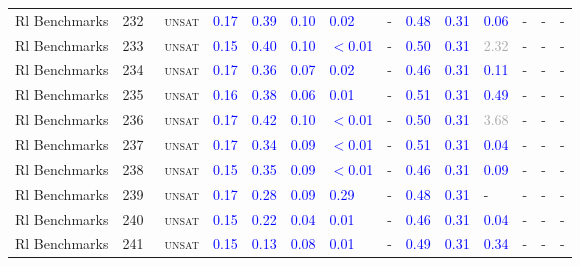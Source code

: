 \begin{center}
{\begin{longtable}{@{}llllllllllllll@{}}
Rl Benchmarks & 232 & ~\textsc{unsat} & \textcolor{blue}{0.17} & \textcolor{blue}{0.39} & \textcolor{blue}{0.10} & \textcolor{blue}{0.02} & - & \textcolor{blue}{0.48} & \textcolor{blue}{0.31} & \textcolor{blue}{0.06} & - & - & - \\
Rl Benchmarks & 233 & ~\textsc{unsat} & \textcolor{blue}{0.15} & \textcolor{blue}{0.40} & \textcolor{blue}{0.10} & \textcolor{blue}{$<$0.01} & - & \textcolor{blue}{0.50} & \textcolor{blue}{0.31} & \textcolor{darkgray}{2.32} & - & - & - \\
Rl Benchmarks & 234 & ~\textsc{unsat} & \textcolor{blue}{0.17} & \textcolor{blue}{0.36} & \textcolor{blue}{0.07} & \textcolor{blue}{0.02} & - & \textcolor{blue}{0.46} & \textcolor{blue}{0.31} & \textcolor{blue}{0.11} & - & - & - \\
Rl Benchmarks & 235 & ~\textsc{unsat} & \textcolor{blue}{0.16} & \textcolor{blue}{0.38} & \textcolor{blue}{0.06} & \textcolor{blue}{0.01} & - & \textcolor{blue}{0.51} & \textcolor{blue}{0.31} & \textcolor{blue}{0.49} & - & - & - \\
Rl Benchmarks & 236 & ~\textsc{unsat} & \textcolor{blue}{0.17} & \textcolor{blue}{0.42} & \textcolor{blue}{0.10} & \textcolor{blue}{$<$0.01} & - & \textcolor{blue}{0.50} & \textcolor{blue}{0.31} & \textcolor{darkgray}{3.68} & - & - & - \\
Rl Benchmarks & 237 & ~\textsc{unsat} & \textcolor{blue}{0.17} & \textcolor{blue}{0.34} & \textcolor{blue}{0.09} & \textcolor{blue}{$<$0.01} & - & \textcolor{blue}{0.51} & \textcolor{blue}{0.31} & \textcolor{blue}{0.04} & - & - & - \\
Rl Benchmarks & 238 & ~\textsc{unsat} & \textcolor{blue}{0.15} & \textcolor{blue}{0.35} & \textcolor{blue}{0.09} & \textcolor{blue}{$<$0.01} & - & \textcolor{blue}{0.46} & \textcolor{blue}{0.31} & \textcolor{blue}{0.09} & - & - & - \\
Rl Benchmarks & 239 & ~\textsc{unsat} & \textcolor{blue}{0.17} & \textcolor{blue}{0.28} & \textcolor{blue}{0.09} & \textcolor{blue}{0.29} & - & \textcolor{blue}{0.48} & \textcolor{blue}{0.31} & - & - & - & - \\
Rl Benchmarks & 240 & ~\textsc{unsat} & \textcolor{blue}{0.15} & \textcolor{blue}{0.22} & \textcolor{blue}{0.04} & \textcolor{blue}{0.01} & - & \textcolor{blue}{0.46} & \textcolor{blue}{0.31} & \textcolor{blue}{0.04} & - & - & - \\
Rl Benchmarks & 241 & ~\textsc{unsat} & \textcolor{blue}{0.15} & \textcolor{blue}{0.13} & \textcolor{blue}{0.08} & \textcolor{blue}{0.01} & - & \textcolor{blue}{0.49} & \textcolor{blue}{0.31} & \textcolor{blue}{0.34} & - & - & - \\

\end{longtable}}
\end{center}
